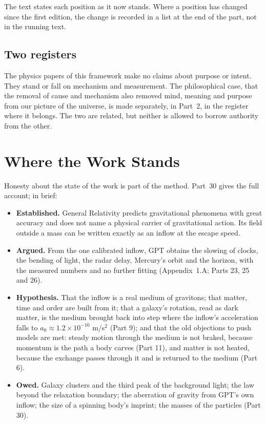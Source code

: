 \documentclass[11pt,a4paper]{article}
\begin{document}
\statuskey

The text states each position as it now stands. Where a position has changed since the first edition, the change is recorded in a list at the end of the part, not in the running text.

\subsection*{Two registers}

The physics papers of this framework make no claims about purpose or intent. They stand or fall on mechanism and measurement. The philosophical case, that the removal of cause and mechanism also removed mind, meaning and purpose from our picture of the universe, is made separately, in Part~2, in the register where it belongs. The two are related, but neither is allowed to borrow authority from the other.

\section{Where the Work Stands}

Honesty about the state of the work is part of the method. Part~30 gives the full account; in brief:
\begin{itemize}
  \item \textbf{Established.} General Relativity predicts gravitational phenomena with great accuracy and does not name a physical carrier of gravitational action. Its field outside a mass can be written exactly as an inflow at the escape speed.
  \item \textbf{Argued.} From the one calibrated inflow, GPT obtains the slowing of clocks, the bending of light, the radar delay, Mercury's orbit and the horizon, with the measured numbers and no further fitting (Appendix~1.A; Parts 23, 25 and 26). 
  \item \textbf{Hypothesis.} That the inflow is a real medium of gravitons; that matter, time and order are built from it; that a galaxy's rotation, read as dark matter, is the medium brought back into step where the inflow's acceleration falls to $a_0\approx1.2\times10^{-10}$ m/s$^2$ (Part 9); and that the old objections to push models are met: steady motion through the medium is not braked, because momentum is the path a body carves (Part 11), and matter is not heated, because the exchange passes through it and is returned to the medium (Part 6).
  \item \textbf{Owed.} Galaxy clusters and the third peak of the background light; the law beyond the relaxation boundary; the aberration of gravity from GPT's own inflow; the size of a spinning body's imprint; the masses of the particles (Part 30).
\end{itemize}
\end{document}
